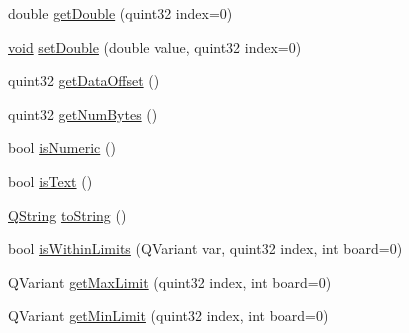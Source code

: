 \begin{DoxyCompactItemize}
\item 
double \hyperlink{group___u_a_v_objects_plugin_gac189fe8172d3c25a937b7d0106025dfe}{get\-Double} (quint32 index=0)
\item 
\hyperlink{group___u_a_v_objects_plugin_ga444cf2ff3f0ecbe028adce838d373f5c}{void} \hyperlink{group___u_a_v_objects_plugin_ga6c5e6a55d16226d0cfef0d2f512e243e}{set\-Double} (double value, quint32 index=0)
\item 
quint32 \hyperlink{group___u_a_v_objects_plugin_gaacffb4e86c637986046b656bb1e8219a}{get\-Data\-Offset} ()
\item 
quint32 \hyperlink{group___u_a_v_objects_plugin_ga872f22445800243679ca0860c3b8b7f1}{get\-Num\-Bytes} ()
\item 
bool \hyperlink{group___u_a_v_objects_plugin_ga5e1a07c1bc278bd1d8f1460ca08d13c7}{is\-Numeric} ()
\item 
bool \hyperlink{group___u_a_v_objects_plugin_ga6ad4eb36bd160d16bccdc494caf60938}{is\-Text} ()
\item 
\hyperlink{group___u_a_v_objects_plugin_gab9d252f49c333c94a72f97ce3105a32d}{\-Q\-String} \hyperlink{group___u_a_v_objects_plugin_ga149341e646b59250818f980dce9fd601}{to\-String} ()
\item 
bool \hyperlink{group___u_a_v_objects_plugin_gaab4e295f61848873ab0e45b3546a0035}{is\-Within\-Limits} (\-Q\-Variant var, quint32 index, int board=0)
\item 
\-Q\-Variant \hyperlink{group___u_a_v_objects_plugin_gafbe9b468da7decca7c6ff46202b938ba}{get\-Max\-Limit} (quint32 index, int board=0)
\item 
\-Q\-Variant \hyperlink{group___u_a_v_objects_plugin_ga3f6a930205ce76977ac96ffcfb864a8d}{get\-Min\-Limit} (quint32 index, int board=0)
\end{DoxyCompactItemize}
